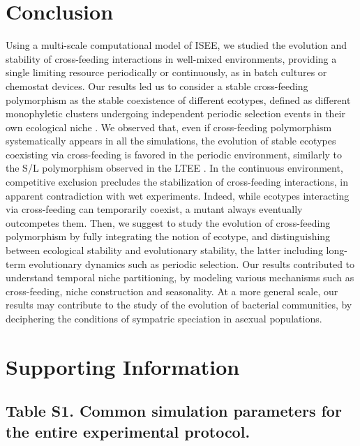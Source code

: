 
\section{Conclusion}

Using a multi-scale computational model of ISEE, we studied the evolution and stability of cross-feeding interactions in well-mixed environments, providing a single limiting resource periodically or continuously, as in batch cultures or chemostat devices. Our results led us to consider a stable cross-feeding polymorphism as the stable coexistence of different ecotypes, defined as different monophyletic clusters undergoing independent periodic selection events in their own ecological niche \citep{cohan-2002}. We observed that, even if cross-feeding polymorphism systematically appears in all the simulations, the evolution of stable ecotypes coexisting via cross-feeding is favored in the periodic environment, similarly to the S/L polymorphism observed in the LTEE \citep{rozen-et-al-2000}. In the continuous environment, competitive exclusion precludes the stabilization of cross-feeding interactions, in apparent contradiction with wet experiments. Indeed, while ecotypes interacting via cross-feeding can temporarily coexist, a mutant always eventually outcompetes them. Then, we suggest to study the evolution of cross-feeding polymorphism by fully integrating the notion of ecotype, and distinguishing between ecological stability and evolutionary stability, the latter including long-term evolutionary dynamics such as periodic selection. Our results contributed to understand temporal niche partitioning, by modeling various mechanisms such as cross-feeding, niche construction and seasonality. At a more general scale, our results may contribute to the study of the evolution of bacterial communities, by deciphering the conditions of sympatric speciation in asexual populations.

\newpage


\section{Supporting Information}

\subsection{Table S1. Common simulation parameters for the entire experimental protocol.}
\label{table:part2:first_result:S1_Table}

